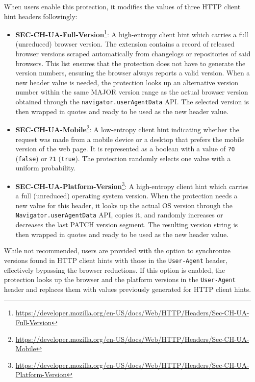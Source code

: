 When users enable this protection, it modifies the values of three HTTP client hint headers followingly:

\begin{itemize}
	\item \textbf{SEC-CH-UA-Full-Version}\footnote{\url{https://developer.mozilla.org/en-US/docs/Web/HTTP/Headers/Sec-CH-UA-Full-Version}}: A high-entropy client hint which carries a full (unreduced) browser version. The extension contains a record of released browser versions scraped automatically from changelogs or repositories of said browsers. This list ensures that the protection does not have to generate the version numbers, ensuring the browser always reports a valid version. When a new header value is needed, the protection looks up an alternative version number within the same MAJOR version range as the actual browser version obtained through the \texttt{navigator.userAgentData} API. The selected version is then wrapped in quotes and ready to be used as the new header value.
	\item \textbf{SEC-CH-UA-Mobile}\footnote{\url{https://developer.mozilla.org/en-US/docs/Web/HTTP/Headers/Sec-CH-UA-Mobile}}: A low-entropy client hint indicating whether the request was made from a mobile device or a desktop that prefers the mobile version of the web page. It is represented as a boolean with a value of \texttt{?0} (\texttt{false}) or \texttt{?1} (\texttt{true}). The protection randomly selects one value with a uniform probability.
	\item \textbf{SEC-CH-UA-Platform-Version}\footnote{\url{https://developer.mozilla.org/en-US/docs/Web/HTTP/Headers/Sec-CH-UA-Platform-Version}}: A high-entropy client hint which carries a full (unreduced) operating system version. When the protection needs a new value for this header, it looks up the actual OS version through the \texttt{Navigator.userAgentData} API, copies it, and randomly increases or decreases the last PATCH version segment. The resulting version string is then wrapped in quotes and ready to be used as the new header value.
\end{itemize}

While not recommended, users are provided with the option to synchronize versions found in HTTP client hints with those in the \texttt{User-Agent} header, effectively bypassing the browser reductions. If this option is enabled, the protection looks up the browser and the platform versions in the \texttt{User-Agent} header and replaces them with values previously generated for HTTP client hints.


